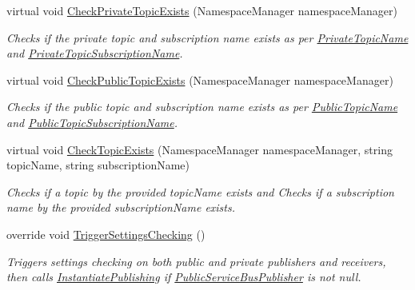 \begin{DoxyCompactItemize}
virtual void \hyperlink{classCqrs_1_1Azure_1_1ServiceBus_1_1AzureServiceBus_add2d99ff99f1af5470082b1de340c04a_add2d99ff99f1af5470082b1de340c04a}{Check\+Private\+Topic\+Exists} (Namespace\+Manager namespace\+Manager)
\begin{DoxyCompactList}\small\item\em Checks if the private topic and subscription name exists as per \hyperlink{classCqrs_1_1Azure_1_1ServiceBus_1_1AzureServiceBus_a7af8ebcdd25672ff2252085637904f82_a7af8ebcdd25672ff2252085637904f82}{Private\+Topic\+Name} and \hyperlink{classCqrs_1_1Azure_1_1ServiceBus_1_1AzureServiceBus_a22498d51bba26c801b3b553fb451a6ae_a22498d51bba26c801b3b553fb451a6ae}{Private\+Topic\+Subscription\+Name}. \end{DoxyCompactList}\item 
virtual void \hyperlink{classCqrs_1_1Azure_1_1ServiceBus_1_1AzureServiceBus_aae464d1d93ae6600ff5ace028160dd3c_aae464d1d93ae6600ff5ace028160dd3c}{Check\+Public\+Topic\+Exists} (Namespace\+Manager namespace\+Manager)
\begin{DoxyCompactList}\small\item\em Checks if the public topic and subscription name exists as per \hyperlink{classCqrs_1_1Azure_1_1ServiceBus_1_1AzureServiceBus_ac6f4fbafebcde04a8493462b688e0abe_ac6f4fbafebcde04a8493462b688e0abe}{Public\+Topic\+Name} and \hyperlink{classCqrs_1_1Azure_1_1ServiceBus_1_1AzureServiceBus_adab1b2f0dc9f199d5f0aa60d57ba71c8_adab1b2f0dc9f199d5f0aa60d57ba71c8}{Public\+Topic\+Subscription\+Name}. \end{DoxyCompactList}\item 
virtual void \hyperlink{classCqrs_1_1Azure_1_1ServiceBus_1_1AzureServiceBus_a167ace15de6e40d5ec0b0c2e0fd95504_a167ace15de6e40d5ec0b0c2e0fd95504}{Check\+Topic\+Exists} (Namespace\+Manager namespace\+Manager, string topic\+Name, string subscription\+Name)
\begin{DoxyCompactList}\small\item\em Checks if a topic by the provided {\itshape topic\+Name}  exists and Checks if a subscription name by the provided {\itshape subscription\+Name}  exists. \end{DoxyCompactList}\item 
override void \hyperlink{classCqrs_1_1Azure_1_1ServiceBus_1_1AzureServiceBus_ae4b736019e332a81eb08d3696f8b6e7e_ae4b736019e332a81eb08d3696f8b6e7e}{Trigger\+Settings\+Checking} ()
\begin{DoxyCompactList}\small\item\em Triggers settings checking on both public and private publishers and receivers, then calls \hyperlink{classCqrs_1_1Azure_1_1ServiceBus_1_1AzureServiceBus_a5c286d29b0bbfe3770f3407efda57036_a5c286d29b0bbfe3770f3407efda57036}{Instantiate\+Publishing} if \hyperlink{classCqrs_1_1Azure_1_1ServiceBus_1_1AzureServiceBus_a17195f3c8e05ec37dfac37a8e9e1b089_a17195f3c8e05ec37dfac37a8e9e1b089}{Public\+Service\+Bus\+Publisher} is not null. \end{DoxyCompactList}\item 

\end{DoxyCompactItemize}
